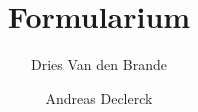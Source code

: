 \usepackage[dutch]{babel}
\usepackage{amsmath}
\usepackage{amssymb}
\usepackage{physics}

\title{Formularium}
\author{Dries Van den Brande \and Andreas Declerck}

\newcommand{\R}{\mathbb{R}}
\newcommand{\Z}{\mathbb{Z}}
